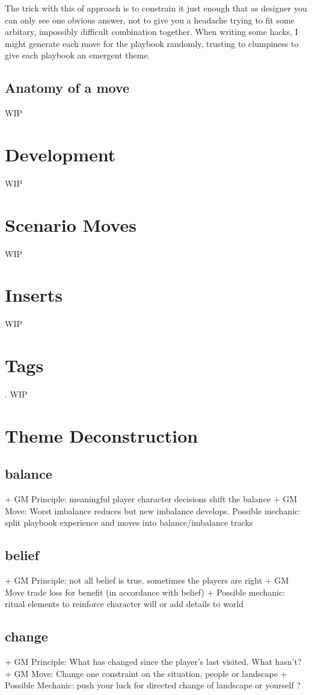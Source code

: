 \documentclass{tufte-handout}
\begin{document}
The trick with this of approach is to constrain it just enough that as designer you can only see one obvious answer, not to give you a headache trying to fit some arbitary, impossibly difficult combination together. 
When writing some hacks, I might generate each move for the playbook randomly, trusting to clumpiness to give each playbook an emergent theme. 
 
 \subsection{Anatomy of a move}
WIP

\section{ Development}
WIP
\section{Scenario Moves}
WIP
\section{Inserts}
WIP
\section{Tags}.
WIP
\section{Theme Deconstruction}

\subsection{balance}
+ GM Principle: meaningful player character decisions shift the balance
+ GM Move: Worst imbalance reduces but new imbalance develops.	
Possible mechanic: split playbook experience and moves into balance/imbalance tracks

\subsection{belief}
+ GM Principle: not all belief is true. sometimes the players are right
+ GM Move trade loss for benefit (in accordance with belief)
+ Possible mechanic: ritual elements to reinforce character will or add details to world

\subsection{change}
+ GM Principle: What has changed since the player's last visited. What hasn't?	
+ GM Move: Change one constraint on the situation, people or landscape
+ Possible Mechanic: push your luck for directed change of landscape or yourself ?
\end{document}
